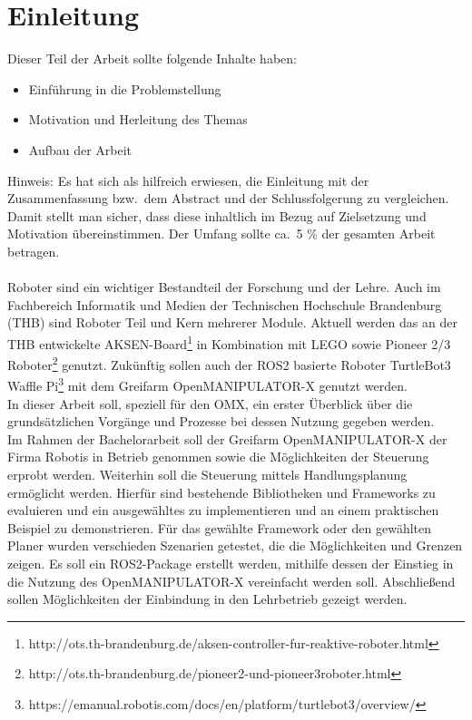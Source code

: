 \section{Einleitung} \label{einleitung}
Dieser Teil der Arbeit sollte folgende Inhalte haben:

\begin{itemize}
\item Einführung in die Problemstellung
\item Motivation und Herleitung des Themas
\item Aufbau der Arbeit
\end{itemize}

Hinweis:
Es hat sich als hilfreich erwiesen, die Einleitung mit der Zusammenfassung bzw.\ dem Abstract und der Schlussfolgerung zu vergleichen.
Damit stellt man sicher, dass diese inhaltlich im Bezug auf Zielsetzung und Motivation übereinstimmen.
Der Umfang sollte ca.\ 5 \% der gesamten Arbeit betragen.
\\
\\
Roboter sind ein wichtiger Bestandteil der Forschung und der Lehre.
Auch im Fachbereich Informatik und Medien der Technischen Hochschule Brandenburg (THB) sind Roboter Teil und Kern mehrerer Module.
Aktuell werden das an der THB entwickelte AKSEN-Board\footnote{http://ots.th-brandenburg.de/aksen-controller-fur-reaktive-roboter.html} in Kombination mit LEGO sowie Pioneer 2/3 Roboter\footnote{http://ots.th-brandenburg.de/pioneer2-und-pioneer3roboter.html} genutzt.
Zukünftig sollen auch der \acs{ROS2} basierte Roboter TurtleBot3 Waffle Pi\footnote{https://emanual.robotis.com/docs/en/platform/turtlebot3/overview/} mit dem Greifarm OpenMANIPULATOR-X genutzt werden.\\
In dieser Arbeit soll, speziell für den OMX, ein erster Überblick über die grundsätzlichen Vorgänge und Prozesse bei dessen Nutzung gegeben werden.\\

Im Rahmen der Bachelorarbeit soll der Greifarm OpenMANIPULATOR-X der Firma Robotis in Betrieb genommen sowie die Möglichkeiten der Steuerung erprobt werden.
Weiterhin soll die Steuerung mittels Handlungsplanung ermöglicht werden.
Hierfür sind bestehende Bibliotheken und Frameworks zu evaluieren und ein ausgewähltes zu implementieren und an einem praktischen Beispiel zu demonstrieren.
Für das gewählte Framework oder den gewählten Planer wurden verschieden Szenarien getestet, die die Möglichkeiten und Grenzen zeigen.
Es soll ein \acs{ROS2}-Package erstellt werden, mithilfe dessen der Einstieg in die Nutzung des OpenMANIPULATOR-X vereinfacht werden soll.
Abschließend sollen Möglichkeiten der Einbindung in den Lehrbetrieb gezeigt werden.


